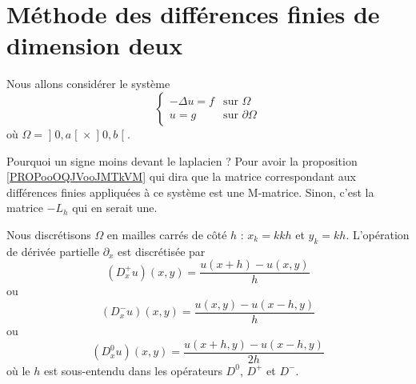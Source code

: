 \section{Méthode des différences finies de dimension deux}

Nous allons considérer le système
\begin{equation}                \label{SYSooTANLooRgnIMp}
     \begin{cases}
         -\Delta u=f    &   \text{sur } \Omega\\
         u=g            &   \text{sur } \partial\Omega
     \end{cases}
\end{equation}
où \( \Omega=\mathopen] 0 , a \mathclose[\times \mathopen] 0 , b \mathclose[\).

\begin{remark}
    Pourquoi un signe moins devant le laplacien ? Pour avoir la proposition \ref{PROPooOQJVooJMTkVM} qui dira que la matrice correspondant aux différences finies appliquées à ce système est une M-matrice. Sinon, c'est la matrice \(-L_h\) qui en serait une.
\end{remark}

Nous discrétisons \( \Omega\) en mailles carrés de côté \( h\) : \( x_k=kkh\) et \( y_k=kh\). L'opération de dérivée partielle \( \partial_x\) est discrétisée par
\begin{equation}
    (D_x^+u)(x,y)=\frac{ u(x+h)-u(x,y) }{ h }
\end{equation}
ou
\begin{equation}
    (D_x^-u)(x,y)=\frac{ u(x,y)-u(x-h,y) }{ h }
\end{equation}
ou
\begin{equation}
    (D^0_xu)(x,y)=\frac{ u(x+h,y)-u(x-h,y) }{ 2h }
\end{equation}
où le \( h\) est sous-entendu dans les opérateurs \( D^0\), \( D^+\) et \( D^-\).

